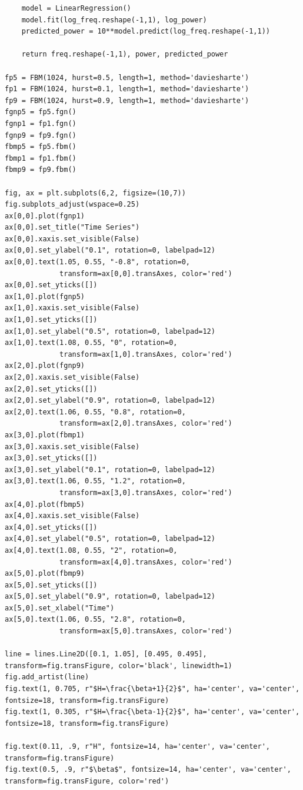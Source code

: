\documentclass[
  sn-vancouver,
  Numbered,
  referee,
  lineno]{sn-jnl}
\begin{document}
\begin{verbatim}
    model = LinearRegression()
    model.fit(log_freq.reshape(-1,1), log_power)
    predicted_power = 10**model.predict(log_freq.reshape(-1,1))

    return freq.reshape(-1,1), power, predicted_power

fp5 = FBM(1024, hurst=0.5, length=1, method='daviesharte')
fp1 = FBM(1024, hurst=0.1, length=1, method='daviesharte')
fp9 = FBM(1024, hurst=0.9, length=1, method='daviesharte')
fgnp5 = fp5.fgn()
fgnp1 = fp1.fgn()
fgnp9 = fp9.fgn()
fbmp5 = fp5.fbm()
fbmp1 = fp1.fbm()
fbmp9 = fp9.fbm()

fig, ax = plt.subplots(6,2, figsize=(10,7))
fig.subplots_adjust(wspace=0.25)
ax[0,0].plot(fgnp1)
ax[0,0].set_title("Time Series")
ax[0,0].xaxis.set_visible(False)
ax[0,0].set_ylabel("0.1", rotation=0, labelpad=12)
ax[0,0].text(1.05, 0.55, "-0.8", rotation=0,
             transform=ax[0,0].transAxes, color='red')
ax[0,0].set_yticks([])
ax[1,0].plot(fgnp5)
ax[1,0].xaxis.set_visible(False)
ax[1,0].set_yticks([])
ax[1,0].set_ylabel("0.5", rotation=0, labelpad=12)
ax[1,0].text(1.08, 0.55, "0", rotation=0,
             transform=ax[1,0].transAxes, color='red')
ax[2,0].plot(fgnp9)
ax[2,0].xaxis.set_visible(False)
ax[2,0].set_yticks([])
ax[2,0].set_ylabel("0.9", rotation=0, labelpad=12)
ax[2,0].text(1.06, 0.55, "0.8", rotation=0,
             transform=ax[2,0].transAxes, color='red')
ax[3,0].plot(fbmp1)
ax[3,0].xaxis.set_visible(False)
ax[3,0].set_yticks([])
ax[3,0].set_ylabel("0.1", rotation=0, labelpad=12)
ax[3,0].text(1.06, 0.55, "1.2", rotation=0,
             transform=ax[3,0].transAxes, color='red')
ax[4,0].plot(fbmp5)
ax[4,0].xaxis.set_visible(False)
ax[4,0].set_yticks([])
ax[4,0].set_ylabel("0.5", rotation=0, labelpad=12)
ax[4,0].text(1.08, 0.55, "2", rotation=0,
             transform=ax[4,0].transAxes, color='red')
ax[5,0].plot(fbmp9)
ax[5,0].set_yticks([])
ax[5,0].set_ylabel("0.9", rotation=0, labelpad=12)
ax[5,0].set_xlabel("Time")
ax[5,0].text(1.06, 0.55, "2.8", rotation=0,
             transform=ax[5,0].transAxes, color='red')

line = lines.Line2D([0.1, 1.05], [0.495, 0.495], transform=fig.transFigure, color='black', linewidth=1)
fig.add_artist(line)
fig.text(1, 0.705, r"$H=\frac{\beta+1}{2}$", ha='center', va='center', fontsize=18, transform=fig.transFigure)
fig.text(1, 0.305, r"$H=\frac{\beta-1}{2}$", ha='center', va='center', fontsize=18, transform=fig.transFigure)

fig.text(0.11, .9, r"H", fontsize=14, ha='center', va='center', transform=fig.transFigure)
fig.text(0.5, .9, r"$\beta$", fontsize=14, ha='center', va='center', transform=fig.transFigure, color='red')


\end{verbatim}
\end{document}
